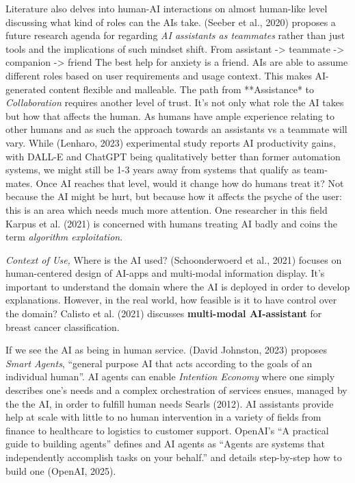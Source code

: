 \documentclass[
  letterpaper,
  DIV=11,
  numbers=noendperiod]{scrartcl}
\begin{document}
Literature also delves into human-AI interactions on almost human-like
level discussing what kind of roles can the AIs take. (Seeber et al.,
2020) proposes a future research agenda for regarding \emph{AI
assistants as teammates} rather than just tools and the implications of
such mindset shift. From assistant -\textgreater{} teammate
-\textgreater{} companion -\textgreater{} friend The best help for
anxiety is a friend. AIs are able to assume different roles based on
user requirements and usage context. This makes AI-generated content
flexible and malleable. The path from **Assistance* to
\emph{Collaboration} requires another level of trust. It's not only what
role the AI takes but how that affects the human. As humans have ample
experience relating to other humans and as such the approach towards an
assistants vs a teammate will vary. While (Lenharo, 2023) experimental
study reports AI productivity gains, with DALL-E and ChatGPT being
qualitatively better than former automation systems, we might still be
1-3 years away from systems that qualify as team-mates. Once AI reaches
that level, would it change how do humans treat it? Not because the AI
might be hurt, but because how it affects the psyche of the user: this
is an area which needs much more attention. One researcher in this field
Karpus et al. (2021) is concerned with humans treating AI badly and
coins the term \emph{algorithm exploitation}.

\emph{Context of Use,} Where is the AI used? (Schoonderwoerd et al.,
2021) focuses on human-centered design of AI-apps and multi-modal
information display. It's important to understand the domain where the
AI is deployed in order to develop explanations. However, in the real
world, how feasible is it to have control over the domain? Calisto et
al. (2021) discusses \textbf{multi-modal AI-assistant} for breast cancer
classification.

If we see the AI as being in human service. (David Johnston, 2023)
proposes \emph{Smart Agents}, ``general purpose AI that acts according
to the goals of an individual human''. AI agents can enable
\emph{Intention Economy} where one simply describes one's needs and a
complex orchestration of services ensues, managed by the the AI, in
order to fulfill human needs Searls (2012). AI assistants provide help
at scale with little to no human intervention in a variety of fields
from finance to healthcare to logistics to customer support. OpenAI's
``A practical guide to building agents'' defines and AI agents as
``Agents are systems that independently accomplish tasks on your
behalf.'' and details step-by-step how to build one (OpenAI, 2025).
\end{document}
